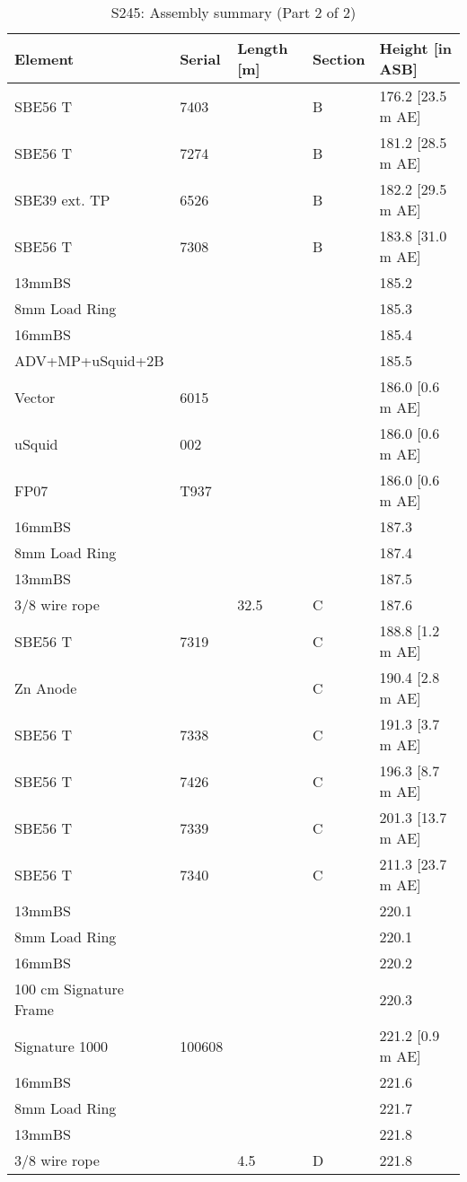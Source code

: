 \documentclass{article}
\begin{document}
\begin{table}[!htbp]
\centering
\caption{S245: Assembly summary (Part 2 of 2)}
\begin{tabular}{lllll}
\toprule
Element & Serial & Length [m] & Section & Height [in ASB] \\
\midrule
SBE56 T & 7403 &  & B & 176.2 [23.5 m AE] \\
SBE56 T & 7274 &  & B & 181.2 [28.5 m AE] \\
SBE39 ext. TP & 6526 &  & B & 182.2 [29.5 m AE] \\
SBE56 T & 7308 &  & B & 183.8 [31.0 m AE] \\
13mmBS &  &  &  & 185.2 \\
8mm Load Ring &  &  &  & 185.3 \\
16mmBS &  &  &  & 185.4 \\
ADV+MP+uSquid+2B &  &  &  & 185.5 \\
Vector & 6015 &  &  & 186.0 [0.6 m AE] \\
uSquid & 002 &  &  & 186.0 [0.6 m AE] \\
FP07 & T937 &  &  & 186.0 [0.6 m AE] \\
16mmBS &  &  &  & 187.3 \\
8mm Load Ring &  &  &  & 187.4 \\
13mmBS &  &  &  & 187.5 \\
3/8 wire rope &  & 32.5 & C & 187.6 \\
SBE56 T & 7319 &  & C & 188.8 [1.2 m AE] \\
Zn Anode &  &  & C & 190.4 [2.8 m AE] \\
SBE56 T & 7338 &  & C & 191.3 [3.7 m AE] \\
SBE56 T & 7426 &  & C & 196.3 [8.7 m AE] \\
SBE56 T & 7339 &  & C & 201.3 [13.7 m AE] \\
SBE56 T & 7340 &  & C & 211.3 [23.7 m AE] \\
13mmBS &  &  &  & 220.1 \\
8mm Load Ring &  &  &  & 220.1 \\
16mmBS &  &  &  & 220.2 \\
100 cm Signature Frame &  &  &  & 220.3 \\
Signature 1000 & 100608 &  &  & 221.2 [0.9 m AE] \\
16mmBS &  &  &  & 221.6 \\
8mm Load Ring &  &  &  & 221.7 \\
13mmBS &  &  &  & 221.8 \\
3/8 wire rope &  & 4.5 & D & 221.8 \\

\end{tabular}
\end{table}
\end{document}
